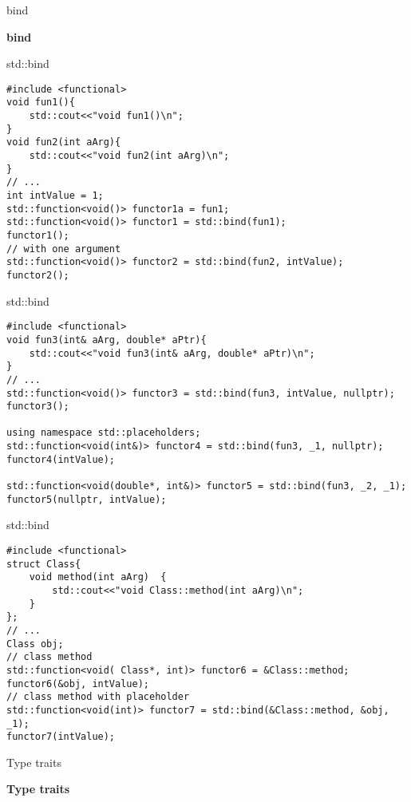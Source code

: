 \documentclass{beamer}
\begin{document}
\begin{frame}[fragile]{bind}
\begin{center}
{\Huge \textbf{bind}}
\end{center}
\end{frame}

\begin{frame}[fragile]{std::bind}
\begin{lstlisting}[style=customcpp]
#include <functional>
void fun1(){
	std::cout<<"void fun1()\n";
}
void fun2(int aArg){
	std::cout<<"void fun2(int aArg)\n";
}
// ...
int intValue = 1;
std::function<void()> functor1a = fun1;
std::function<void()> functor1 = std::bind(fun1);
functor1();
// with one argument
std::function<void()> functor2 = std::bind(fun2, intValue);
functor2();
\end{lstlisting}
\end{frame}

\begin{frame}[fragile]{std::bind}
\begin{lstlisting}[style=customcpp]
#include <functional>
void fun3(int& aArg, double* aPtr){
	std::cout<<"void fun3(int& aArg, double* aPtr)\n";
}
// ...
std::function<void()> functor3 = std::bind(fun3, intValue, nullptr);
functor3();

using namespace std::placeholders;
std::function<void(int&)> functor4 = std::bind(fun3, _1, nullptr);
functor4(intValue);

std::function<void(double*, int&)> functor5 = std::bind(fun3, _2, _1);
functor5(nullptr, intValue);
\end{lstlisting}
\end{frame}

\begin{frame}[fragile]{std::bind}
\begin{lstlisting}[style=customcpp]
#include <functional>
struct Class{
	void method(int aArg)  {
		std::cout<<"void Class::method(int aArg)\n";
	}
};
// ...
Class obj;
// class method
std::function<void( Class*, int)> functor6 = &Class::method;
functor6(&obj, intValue);
// class method with placeholder
std::function<void(int)> functor7 = std::bind(&Class::method, &obj, _1);
functor7(intValue);
\end{lstlisting}
\end{frame}

\begin{frame}[fragile]{Type traits}
\begin{center}
{\Huge \textbf{Type traits}}
\end{center}
\end{frame}
\end{document}
